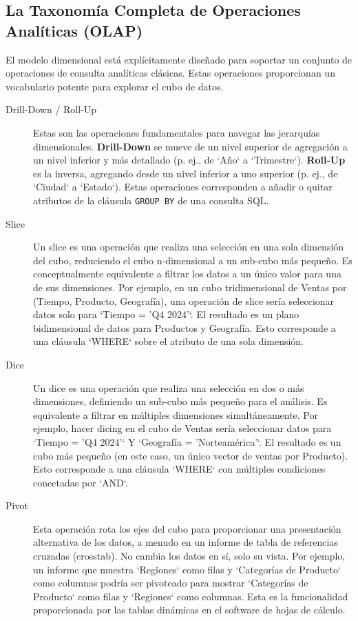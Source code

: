 \documentclass{article}
\begin{document}
\subsection{La Taxonomía Completa de Operaciones Analíticas (OLAP)}
El modelo dimensional está explícitamente diseñado para soportar un conjunto de operaciones de consulta analíticas clásicas. Estas operaciones proporcionan un vocabulario potente para explorar el cubo de datos.
\begin{description}
    \item[Drill-Down / Roll-Up] Estas son las operaciones fundamentales para navegar las jerarquías dimensionales. \textbf{Drill-Down} se mueve de un nivel superior de agregación a un nivel inferior y más detallado (p. ej., de `Año` a `Trimestre`). \textbf{Roll-Up} es la inversa, agregando desde un nivel inferior a uno superior (p. ej., de `Ciudad` a `Estado`). Estas operaciones corresponden a añadir o quitar atributos de la cláusula \texttt{GROUP BY} de una consulta SQL.

    \item[Slice] Un slice es una operación que realiza una selección en una sola dimensión del cubo, reduciendo el cubo n-dimensional a un sub-cubo más pequeño. Es conceptualmente equivalente a filtrar los datos a un único valor para una de sus dimensiones. Por ejemplo, en un cubo tridimensional de Ventas por (Tiempo, Producto, Geografía), una operación de slice sería seleccionar datos solo para `Tiempo = 'Q4 2024'`. El resultado es un plano bidimensional de datos para Productos y Geografía. Esto corresponde a una cláusula `WHERE` sobre el atributo de una sola dimensión.

    \item[Dice] Un dice es una operación que realiza una selección en dos o más dimensiones, definiendo un sub-cubo más pequeño para el análisis. Es equivalente a filtrar en múltiples dimensiones simultáneamente. Por ejemplo, hacer dicing en el cubo de Ventas sería seleccionar datos para `Tiempo = 'Q4 2024'` Y `Geografía = 'Norteamérica'`. El resultado es un cubo más pequeño (en este caso, un único vector de ventas por Producto). Esto corresponde a una cláusula `WHERE` con múltiples condiciones conectadas por `AND`.

    \item[Pivot] Esta operación rota los ejes del cubo para proporcionar una presentación alternativa de los datos, a menudo en un informe de tabla de referencias cruzadas (crosstab). No cambia los datos en sí, solo su vista. Por ejemplo, un informe que muestra `Regiones` como filas y `Categorías de Producto` como columnas podría ser pivoteado para mostrar `Categorías de Producto` como filas y `Regiones` como columnas. Esta es la funcionalidad proporcionada por las tablas dinámicas en el software de hojas de cálculo.
\end{description}
\end{document}
